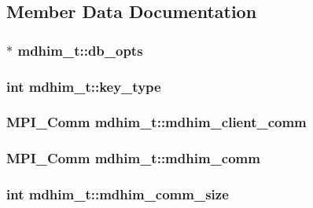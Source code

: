 \subsection{Member Data Documentation}
\hypertarget{structmdhim__t_a16fd571ca5544d43d939fb75eb3b8800}{
\subsubsection[{db\-\_\-opts}]{$\ast$ mdhim\-\_\-t\-::db\-\_\-opts}}\label{d8/dbc/structmdhim__t_a16fd571ca5544d43d939fb75eb3b8800}
\hypertarget{structmdhim__t_ab38232f8b8b48edf417c87088d81d6e4}{
\subsubsection[{key\-\_\-type}]{\setlength{\rightskip}{0pt plus 5cm}int mdhim\-\_\-t\-::key\-\_\-type}}\label{d8/dbc/structmdhim__t_ab38232f8b8b48edf417c87088d81d6e4}
\hypertarget{structmdhim__t_aa7869e9170df4067e8ee986f5e6fda69}{
\subsubsection[{mdhim\-\_\-client\-\_\-comm}]{\setlength{\rightskip}{0pt plus 5cm}M\-P\-I\-\_\-\-Comm mdhim\-\_\-t\-::mdhim\-\_\-client\-\_\-comm}}\label{d8/dbc/structmdhim__t_aa7869e9170df4067e8ee986f5e6fda69}
\hypertarget{structmdhim__t_a9772a2d123d58e9cd3e4514b860aee97}{
\subsubsection[{mdhim\-\_\-comm}]{\setlength{\rightskip}{0pt plus 5cm}M\-P\-I\-\_\-\-Comm mdhim\-\_\-t\-::mdhim\-\_\-comm}}\label{d8/dbc/structmdhim__t_a9772a2d123d58e9cd3e4514b860aee97}
\hypertarget{structmdhim__t_ab4bf1dd32ae146382cade22a706c1380}{
\subsubsection[{mdhim\-\_\-comm\-\_\-size}]{\setlength{\rightskip}{0pt plus 5cm}int mdhim\-\_\-t\-::mdhim\-\_\-comm\-\_\-size}}\label{d8/dbc/structmdhim__t_ab4bf1dd32ae146382cade22a706c1380}
